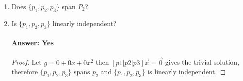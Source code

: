 \documentclass[12pt]{article}
\begin{document}
\begin{enumerate}
\begin{enumerate}
\begin{proof}
\begin{align*}
\begin{bmatrix}
                                            \end{bmatrix}
                                             &
                                            \\
                                            \begin{bmatrix}
                                                    1 & 0 & 2 & \bigm| & 6  \\
                                                    0 & 1 & 0 & \bigm| & -5 \\
                                                    0 & 0 & 1 & \bigm| & 1  \\
                                            \end{bmatrix}
                                            \begin{bmatrix}
                                                    1 & 0 & 0 & \bigm| & 4  \\
                                                    0 & 1 & 0 & \bigm| & -5 \\
                                                    0 & 0 & 1 & \bigm| & 1  \\
                                            \end{bmatrix}
                                             &
                                    \end{align*}
                                    \begin{equation*}
                                            \therefore (k_{1}, k_{2}, k_{3}) = (4, -5, 1) \\
                                    \end{equation*}
                            \end{proof}
                      \item Does $\{p_1,p_2,p_3\}$ span $P_2$?
                      \item Is $\{p_1,p_2,p_3\}$ linearly independent?
                            \paragraph{Answer: Yes}
                            \begin{proof}
                                    Let $g = 0 + 0x + 0x^2$ then $[p1 | p2 | p3]\vec{x} = \vec{0}$ gives the trivial solution, 
                                    therefore $\{p_1,p_2,p_3\}$ spans $p_{2}$ and $\{p_1,p_2,p_3\}$ is linearly independent.
                            \end{proof}
              \end{enumerate}
\end{enumerate}
\end{document}

